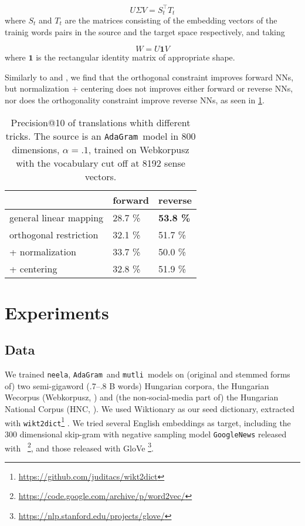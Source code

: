 \documentclass[11pt]{article}
\newcommand{\neelakantan}{\texttt{neela}}
\newcommand{\adagram}{\texttt{AdaGram}}
\newcommand{\mutli}{\texttt{mutli}}
\begin{document}
\[U\Sigma V=S_t^\top T_t\] where $S_t$ and $T_t$ are the matrices consisting of
the embedding vectors of
the trainig words pairs in the source and the target space respectively, and
taking 

\[W=U\mathbf{1}V\] 
where $\mathbf 1$ is the rectangular identity matrix of appropriate shape.

Similarly to \cite{Xing:2015} and \cite{Artetxe:2016}, we find that the
orthogonal constraint improves forward NNs, but normalization + centering does
not improves either forward or reverse NNs, nor does the orthogonality
constraint improve reverse NNs, as seen in \cref{tab:orthog}.

\begin{table}
  \centering
  \begin{tabular}{lll}
    \toprule
                            & forward & reverse \\
    \midrule
    general linear mapping  & 28.7 \% & {\bf 53.8 \%} \\
    orthogonal restriction  & 32.1 \% & 51.7 \% \\
    + normalization         & 33.7 \% & 50.0 \% \\
    + centering             & 32.8 \% & 51.9 \% \\
    \bottomrule
  \end{tabular}
  \caption{Precision@10 of translations whith different tricks. The source is
  an \adagram~model in 800 dimensions,
  $\alpha=.1$, trained on Webkorpusz with the vocabulary cut off at 8192 sense
  vectors.}
  \label{tab:orthog}
\end{table}


\section{Experiments}

\subsection{Data}

We trained \neelakantan, \adagram~and \mutli~models on (original and stemmed
forms of) two semi-gigaword (.7--.8 B words) Hungarian corpora, the Hungarian
Wecorpus (Webkorpusz, \cite{Halacsy:2004}) and (the non-social-media part of)
the Hungarian National Corpus (HNC, \cite{Oravecz:2014}).  We used Wiktionary
as our seed dictionary, extracted with
\texttt{wikt2dict}\footnote{\url{https://github.com/juditacs/wikt2dict}}
\citep{Acs:2013}. We tried several English embeddings as target, including the
300 dimensional skip-gram with negative sampling model \texttt{GoogleNews}
released with
\wordtovec~\citep{Mikolov:2013f}\footnote{\url{https://code.google.com/archive/p/word2vec/}},
and those released with GloVe
\citep{Pennington:2014}\footnote{\url{https://nlp.stanford.edu/projects/glove/}}.
\end{document}
